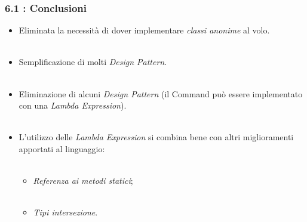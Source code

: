 \documentclass{beamer}
\begin{document}

\begin{frame}
	\frametitle{\textbf{6.1 : Conclusioni}}
	\begin{itemize}
		\item
			Eliminata la necessità di dover implementare \textit{classi anonime} al volo.\\\
		\item
			Semplificazione di molti \textit{Design Pattern}.\\\
		\item
			Eliminazione di alcuni \textit{Design Pattern} (il Command può essere implementato con una \textit{Lambda Expression}).\\\
		\item
			L'utilizzo delle \textit{Lambda Expression} si combina bene con altri miglioramenti apportati al linguaggio:\\\
			\begin{itemize}
				\item 
					\textit{Referenza ai metodi statici};\\\
				\item
					\textit{Tipi intersezione}.
			\end{itemize}
	\end{itemize}
\end{frame}

\end{document}
